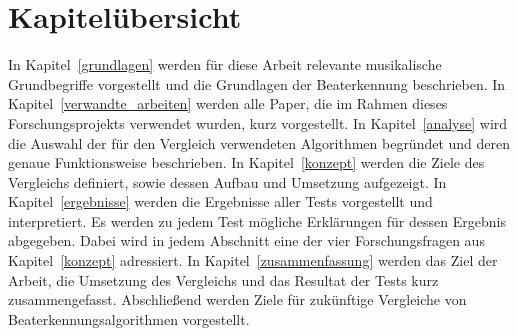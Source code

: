 \section{Kapitelübersicht}
{
	In Kapitel~\ref{grundlagen} werden für diese Arbeit relevante musikalische Grundbegriffe vorgestellt
		und die Grundlagen der Beaterkennung beschrieben.
	In Kapitel~\ref{verwandte_arbeiten} werden alle Paper,
		die im Rahmen dieses Forschungsprojekts verwendet wurden,
		kurz vorgestellt.
	In Kapitel~\ref{analyse} wird die Auswahl der für den Vergleich verwendeten Algorithmen begründet
		und deren genaue Funktionsweise beschrieben.
	In Kapitel~\ref{konzept} werden die Ziele des Vergleichs definiert,
		sowie dessen Aufbau und Umsetzung aufgezeigt.
	In Kapitel~\ref{ergebnisse} werden die Ergebnisse aller Tests vorgestellt und interpretiert.
	Es werden zu jedem Test mögliche Erklärungen für dessen Ergebnis abgegeben.
	Dabei wird in jedem Abschnitt eine der vier Forschungsfragen aus Kapitel~\ref{konzept} adressiert.
	In Kapitel~\ref{zusammenfassung} werden das Ziel der Arbeit, die Umsetzung des Vergleichs und das Resultat der Tests kurz zusammengefasst.
	Abschlie{\ss}end werden Ziele für zukünftige Vergleiche von Beaterkennungsalgorithmen vorgestellt.
}

